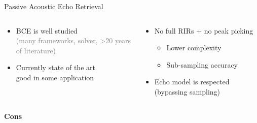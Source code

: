 \begin{frame}[t]{\alert{Passive} Acoustic Echo Retrieval \hfill\faPalette}
\begin{columns}[onlytextwidth]
            \begin{column}{.48\textwidth}
                \begin{itemize}
                    \item BCE is well studied
                    \\\textcolor{gray}{\small (many frameworks, solver, >20 years of literature)}
                    \item Currently state of the art
                    \\good in some application %
                \end{itemize}
            \end{column}
            \begin{column}{.48\textwidth}
                \begin{itemize}
                    \item No full RIRs + no peak picking
                    \begin{itemize}
                        \item Lower complexity
                        \item Sub-sampling accuracy
                    \end{itemize}
                    \item Echo model is respected (bypassing sampling)
                    \\
                    \end{itemize}
            \end{column}%
        \end{columns}

        \vspace{1em}
        \begin{columns}[onlytextwidth] %
            \begin{column}{.02\textwidth}
                \textcolor{myred}{\textbf{Cons}}
            \end{column}


\end{columns}
\end{frame}
